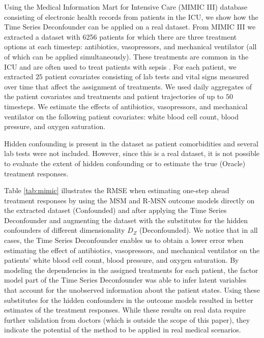 \documentclass{article}
\begin{document}
    Using the Medical Information Mart for Intensive Care (MIMIC III) \citep{johnson2016mimic} database consisting of electronic health records from patients in the ICU, we show how the Time Series Deconfounder can be applied on a real dataset. From MIMIC III we extracted a dataset with 6256 patients for which there are three treatment options at each timestep: antibiotics, vasopressors, and mechanical ventilator (all of which can be applied simultaneously). These treatments are common in the ICU and are often used to treat patients with sepsis \citep{schmidt2016evaluation, scheeren2019current}.  For each patient, we extracted $25$ patient covariates consisting of lab tests and vital signs measured over time that affect the assignment of treatments. We used daily aggregates of the patient covariates and treatments and patient trajectories of up to $50$ timesteps. We estimate the effects of antibiotics, vasopressors, and mechanical ventilator on the following patient covariates: white blood cell count, blood pressure, and oxygen saturation. 
    
    Hidden confounding is present in the dataset as patient comorbidities and several lab tests were not included. However, since this is a real dataset, it is not possible to evaluate the extent of hidden confounding or to estimate the true (Oracle) treatment responses.
	
    Table \ref{tab:mimic} illustrates the RMSE when estimating one-step ahead treatment responses by using the MSM and R-MSN outcome models directly on the extracted dataset (Confounded) and after applying the Time Series Deconfounder and augmenting the dataset with the substitutes for the hidden confounders of different dimensionality $D_Z$ (Deconfounded). We notice that in all cases, the Time Series Deconfounder enables us to obtain a lower error when estimating the effect of antibiotics, vasopressors, and mechanical ventilator on the patients' white blood cell count, blood pressure, and oxygen saturation. By modeling the dependencies in the assigned treatments for each patient, the factor model part of the Time Series Deconfounder was able to infer latent variables that account for the unobserved information about the patient states. Using these substitutes for the hidden confounders in the outcome models resulted in better estimates of the treatment responses. While these results on real data require further validation from doctors (which is outside the scope of this paper), they indicate the potential of the method to be applied in real medical scenarios. 
	
\end{document}
